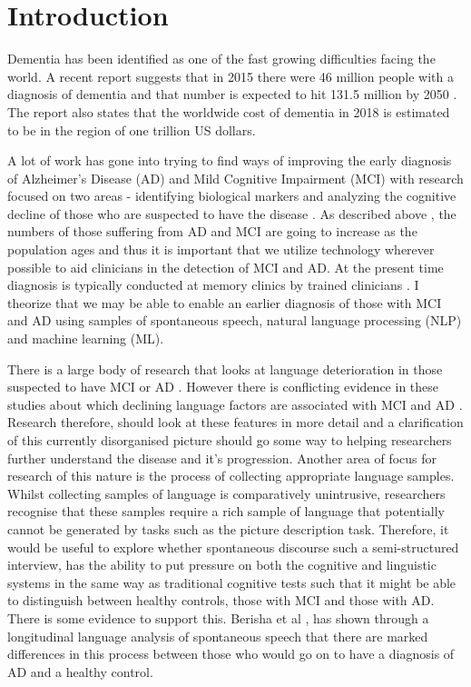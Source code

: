 \documentclass[10pt, letterpaper, twoside, openany]{thesis}
\begin{document}
\section{Introduction}
Dementia has been identified as one of the fast growing difficulties facing the world. A recent report suggests that in 2015 there were 46 million people with a diagnosis of dementia and that number is expected to hit 131.5 million by 2050 \cite{Prince2015}. The report also states that the worldwide cost of dementia in 2018 is estimated to be in the region of one trillion US dollars.
\par
A lot of work has gone into trying to find ways of improving the early diagnosis of Alzheimer's Disease (AD) and Mild Cognitive Impairment (MCI) with research focused on two areas - identifying biological markers and analyzing the cognitive decline of those who are suspected to have the disease \cite{Taler2008}. As described above \cite{Prince2015}, the numbers of those suffering from AD and MCI are going to increase as the population ages and thus it is important that we utilize technology wherever possible to aid clinicians in the detection of MCI and AD. At the present time diagnosis is typically conducted at memory clinics by trained clinicians \cite{Boschi2017}. I theorize that we may be able to enable an earlier diagnosis of those with MCI and AD using samples of spontaneous speech, natural language processing (NLP) and machine learning (ML).
\par
There is a large body of research that looks at language deterioration in those suspected to have MCI or AD \cite{Taler2008, Boschi2017}. However there is conflicting evidence in these studies about which declining language factors are associated with MCI and AD \cite{Taler2008, Boschi2017}. Research therefore, should look at these features in more detail and a clarification of this currently disorganised picture should go some way to helping researchers further understand the disease and it's progression. Another area of focus for research of this nature is the process of collecting appropriate language samples. Whilst collecting samples of language is comparatively unintrusive, researchers recognise that these samples require a rich sample of language that potentially cannot be generated by tasks such as the picture description task. Therefore, it would be useful to explore whether spontaneous discourse such a semi-structured interview, has the ability to put pressure on both the cognitive and linguistic systems in the same way as traditional cognitive tests such that it might be able to distinguish between healthy controls, those with MCI and those with AD. There is some evidence to support this. Berisha et al \cite{Berisha2015}, has shown through a longitudinal language analysis of spontaneous speech that there are marked differences in this process between those who would go on to have a diagnosis of AD and a healthy control. 
\end{document}
